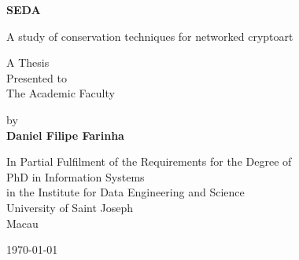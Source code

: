 

\begin{titlepage}
    \begin{center}
        \vspace*{1cm}
        
        
        
        \vspace{2cm}
        
        \Huge
        \textbf{SEDA}
        
        
        \vspace{0.5cm}
        \LARGE
        A study of conservation techniques for networked cryptoart
        
        \vspace{2cm}

        \normalsize
        A Thesis\\
        Presented to\\
        The Academic Faculty
        
        \vspace{1cm}
        
        by\\
        \textbf{Daniel Filipe Farinha}
        
     
        \vfill
       
        
 
 	\vspace{0.5cm}

        \normalsize
        In Partial Fulfilment of the Requirements for the Degree of \\
        PhD in Information Systems\\
        in the Institute for Data Engineering and Science\\
        University of Saint Joseph\\
        Macau\\
        
        \vspace{1cm}

	\monthyeardate\today
	        
    \end{center}
\end{titlepage}
